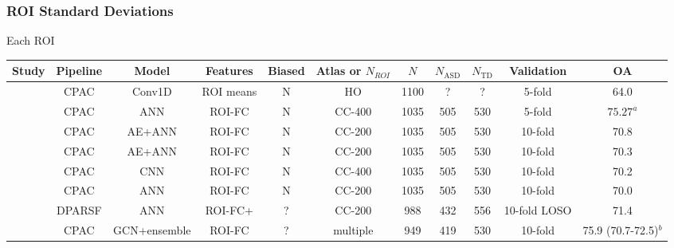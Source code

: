 \documentclass[10pt]{article}
\begin{document}
\subsubsection{ROI Standard Deviations}

Each ROI







\newpage
\begin{landscape}

\begin{table}
  \small
  \centering
  \begin{tabular}{lcccccccccc}
    \toprule
    Study                                                         & Pipeline & Model  & Features & Biased &Atlas or \(N_{ROI}\)  & \(N\) & \(N_\text{ASD}\) & \(N_{\text{TD}}\) & Validation & OA \\
    \midrule
    \citeauthor{el-gazzarHybrid3DCNN3DCLSTM2019}                       &   CPAC   & Conv1D & ROI means&   N    &     HO     & 1100  &   ?   &   ?   &   5-fold   &       64.0       \\
    \citeauthor{yangDeepNeuralNetwork2020}                             &   CPAC   &  ANN   &  ROI-FC  &   N    &   CC-400   & 1035  &  505  &  530  &   5-fold   &     \(75.27^a\)  \\
    \citeauthor{almuqhimASDSAENetSparseAutoencoder2021}                &   CPAC   & AE+ANN &  ROI-FC  &   N    &   CC-200   & 1035  &  505  &  530  &  10-fold   &       70.8       \\
    \citeauthor{eslamiASDDiagNetHybridLearning2019}                    &   CPAC   & AE+ANN &  ROI-FC  &   N    &   CC-200   & 1035  &  505  &  530  &  10-fold   &       70.3       \\
    \citeauthor{sherkatghanadAutomatedDetectionAutism2020}             &   CPAC   &  CNN   &  ROI-FC  &   N    &   CC-400   & 1035  &  505  &  530  &  10-fold   &       70.2       \\
    \citeauthor{heinsfeldIdentificationAutismSpectrum2018}             &   CPAC   &   ANN  &  ROI-FC  &   N    &   CC-200   & 1035  &  505  &  530  &  10-fold   &       70.0       \\
    \citeauthor{ingalhalikarFunctionalConnectivitybasedPrediction2021} &  DPARSF  &  ANN   &  ROI-FC+ &   ?    &   CC-200   &  988  &  432  &  556  &10-fold LOSO&       71.4       \\
    \citeauthor{wangMAGEAutomaticDiagnosis2021}                        &   CPAC   &GCN+ensemble&ROI-FC&   ?    &  multiple  &  949  &  419  &  530  &  10-fold   & 75.9 (70.7-72.5)\(^b\)  \\

\end{tabular}
\end{table}
\end{landscape}
\end{document}
